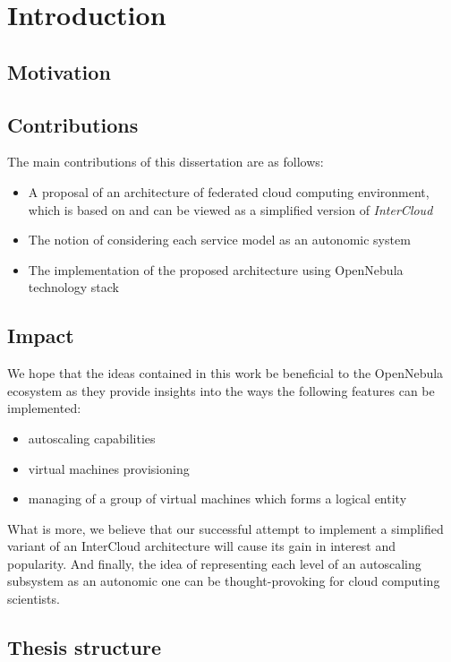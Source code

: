 \chapter{Introduction}



\section{Motivation}



\section{Contributions}
The main contributions of this dissertation are as follows:
\begin{itemize}
  \item A proposal of an architecture of federated cloud computing environment, which is based on and can be viewed as a simplified version of \emph{InterCloud}
  \item The notion of considering each service model as an autonomic system
  \item The implementation of the proposed architecture using OpenNebula technology stack
\end{itemize}

\section{Impact}
We hope that the ideas contained in this work be beneficial to the OpenNebula ecosystem as they provide insights into the ways the following features can be implemented:
\begin{itemize}
  \item autoscaling capabilities
  \item virtual machines provisioning
  \item managing of a group of virtual machines which forms a logical entity
\end{itemize}
What is more, we believe that our successful attempt to implement a simplified variant of an InterCloud architecture will cause its gain in interest and popularity. And finally, the idea of representing each level of an autoscaling subsystem as an autonomic one can be thought-provoking for cloud computing scientists.
\section{Thesis structure}

